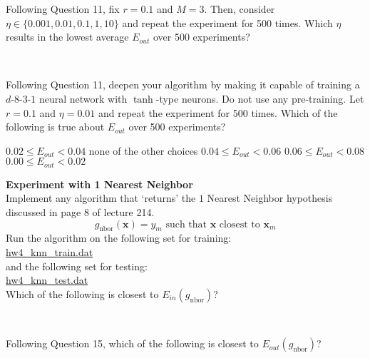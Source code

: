 \documentclass[a4paper,10pt]{exam}
\begin{document}
\begin{questions}
	   \question Following Question 11, fix $r=0.1$ and $M=3$. Then, consider $\eta \in \{0.001, 0.01, 0.1, 1, 10\}$ and repeat the experiment for 500 times. Which $\eta$ results in the lowest average $E_{out}$ over 500 experiments?
	   \begin{choices}
	   	\\
	   \end{choices}
	   
	   \question Following Question 11, deepen your algorithm by making it capable of training a $d$-$8$-$3$-$1$ neural network with $\tanh$-type neurons. Do not use any pre-training. Let $r=0.1$ and $\eta = 0.01$ and repeat the experiment for 500 times. Which of the following is true about $E_{out}$ over 500 experiments?
	   \begin{choices}
	   	\CorrectChoice $0.02 \leq E_{out} < 0.04$
	   	\choice none of the other choices
	   	\choice $0.04 \leq E_{out} < 0.06$
	   	\choice $0.06 \leq E_{out} < 0.08$
	   	\choice $0.00 \leq E_{out} < 0.02$\\ 
	   \end{choices}
	   
	   \question \textbf{Experiment with 1 Nearest Neighbor}\\
	   Implement any algorithm that `returns' the $1$ Nearest Neighbor hypothesis discussed in page 8 of lecture 214. 
	   \[g_{\text{nbor}}(\mathbf{x}) = y_m \mbox{ such that } \mathbf{x} \mbox{ closest to } \mathbf{x}_m\]
	   Run the algorithm on the following set for training:\\
	   \href{https://d396qusza40orc.cloudfront.net/ntumltwo/hw4_data/hw4_knn_train.dat}{hw4\_knn\_train.dat}\\
	   and the following set for testing:\\
	   \href{https://d396qusza40orc.cloudfront.net/ntumltwo/hw4_data/hw4_knn_test.dat}{hw4\_knn\_test.dat}
	   \\Which of the following is closest to $E_{in}(g_{\text{nbor}})$?
	   \begin{choices}
	   	\choice 0.2
	   	\choice 0.3
	   	\CorrectChoice 0.0
	   	\choice 0.1
	   	\\
	   \end{choices}
	   
	   \question Following Question 15, which of the following is closest to $E_{out}(g_{\text{nbor}})$?
	   \begin{choices}
	   	\choice 0.30
	   	8
	   	\CorrectChoice 0.34
	   	2
	   	\\
	   \end{choices}
	   

\end{questions}
\end{document}
